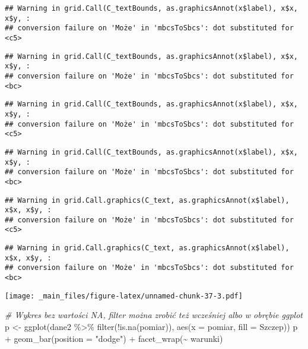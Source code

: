 \documentclass[
]{book}
\newenvironment{Shaded}{\begin{snugshade}}{\end{snugshade}}
\newcommand{\AttributeTok}[1]{\textcolor[rgb]{0.77,0.63,0.00}{#1}}
\newcommand{\CommentTok}[1]{\textcolor[rgb]{0.56,0.35,0.01}{\textit{#1}}}
\newcommand{\FunctionTok}[1]{\textcolor[rgb]{0.00,0.00,0.00}{#1}}
\newcommand{\NormalTok}[1]{#1}
\newcommand{\OtherTok}[1]{\textcolor[rgb]{0.56,0.35,0.01}{#1}}
\newcommand{\SpecialCharTok}[1]{\textcolor[rgb]{0.00,0.00,0.00}{#1}}
\newcommand{\StringTok}[1]{\textcolor[rgb]{0.31,0.60,0.02}{#1}}
\begin{document}
\begin{verbatim}
## Warning in grid.Call(C_textBounds, as.graphicsAnnot(x$label), x$x, x$y, :
## conversion failure on 'Może' in 'mbcsToSbcs': dot substituted for <c5>
\end{verbatim}

\begin{verbatim}
## Warning in grid.Call(C_textBounds, as.graphicsAnnot(x$label), x$x, x$y, :
## conversion failure on 'Może' in 'mbcsToSbcs': dot substituted for <bc>
\end{verbatim}

\begin{verbatim}
## Warning in grid.Call(C_textBounds, as.graphicsAnnot(x$label), x$x, x$y, :
## conversion failure on 'Może' in 'mbcsToSbcs': dot substituted for <c5>
\end{verbatim}

\begin{verbatim}
## Warning in grid.Call(C_textBounds, as.graphicsAnnot(x$label), x$x, x$y, :
## conversion failure on 'Może' in 'mbcsToSbcs': dot substituted for <bc>
\end{verbatim}

\begin{verbatim}
## Warning in grid.Call.graphics(C_text, as.graphicsAnnot(x$label), x$x, x$y, :
## conversion failure on 'Może' in 'mbcsToSbcs': dot substituted for <c5>
\end{verbatim}

\begin{verbatim}
## Warning in grid.Call.graphics(C_text, as.graphicsAnnot(x$label), x$x, x$y, :
## conversion failure on 'Może' in 'mbcsToSbcs': dot substituted for <bc>
\end{verbatim}

\texttt{[image: \_main\_files/figure-latex/unnamed-chunk-37-3.pdf]}

\begin{Shaded}
\begin{Highlighting}[]
\CommentTok{\# Wykres bez wartości NA, filter można zrobić też wcześniej albo w obrębie ggplot}
\NormalTok{p }\OtherTok{\textless{}{-}} \FunctionTok{ggplot}\NormalTok{(dane2 }\SpecialCharTok{\%\textgreater{}\%} \FunctionTok{filter}\NormalTok{(}\SpecialCharTok{!}\FunctionTok{is.na}\NormalTok{(pomiar)), }\FunctionTok{aes}\NormalTok{(}\AttributeTok{x =}\NormalTok{ pomiar, }\AttributeTok{fill =}\NormalTok{ Szczep))}
\NormalTok{p }\SpecialCharTok{+} \FunctionTok{geom\_bar}\NormalTok{(}\AttributeTok{position =} \StringTok{"dodge"}\NormalTok{) }\SpecialCharTok{+} \FunctionTok{facet\_wrap}\NormalTok{(}\SpecialCharTok{\textasciitilde{}}\NormalTok{ warunki)}
\end{Highlighting}
\end{Shaded}
\end{document}
